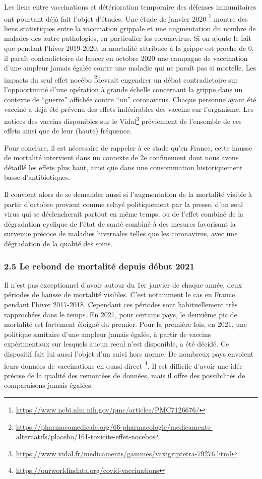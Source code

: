 \documentclass[
]{article}
\begin{document}
Les liens entre vaccinations et détérioration temporaire des défenses
immunitaires ont pourtant déjà fait l'objet d'études. Une étude de
janvier 2020 \footnote{\url{https://www.ncbi.nlm.nih.gov/pmc/articles/PMC7126676/}}
montre des liens statistiques entre la vaccination grippale et une
augmentation du nombre de malades des autre pathologies, en particulier
les coronavirus. Si on ajoute le fait que pendant l'hiver 2019-2020, la
mortalité attribuée à la grippe est proche de 0, il paraît
contradictoire de lancer en octobre 2020 une campagne de vaccination
d'une ampleur jamais égalée contre une maladie qui ne paraît pas si
mortelle. Les impacts du seul effet nocébo \footnote{\url{https://pharmacomedicale.org/66-pharmacologie/medicaments-alternatifs/placebo/161-toxicite-effet-nocebo}}devrait
engendrer un débat contradictoire sur l'oppoortunité d'une opération à
grande échelle concernant la grippe dans un contexte de ``guerre''
affichée contre ``un'' coronavirus. Chaque personne ayant été vacciné a
déjà été prévenu des effets indésirables des vaccins sur l'organisme.
Les notices des vaccins disponibles sur le Vidal\footnote{\url{https://www.vidal.fr/medicaments/gammes/vaxigriptetra-79276.html}}
préviennent de l'ensemble de ces effets ainsi que de leur (haute)
fréquence.

Pour conclure, il est nécessaire de rappeler à ce stade qu'en France,
cette hausse de mortalité intervient dans un contexte de 2e confinement
dont nous avons détaillé les effets plus haut, ainsi que dans une
consommation historiquement basse d'antibiotiques.

Il convient alors de se demander aussi si l'augmentation de la mortalité
visible à partir d'octobre provient comme relayé politiquement par la
presse, d'un seul virus qui se déclencherait partout en même temps, ou
de l'effet combiné de la dégradation cyclique de l'état de santé combiné
à des mesures favorisant la survenue précoce de maladies hivernales
telles que les coronavirus, avec une dégradation de la qualité des
soins.

\hypertarget{le-rebond-de-mortalituxe9-depuis-duxe9but-2021}{%
\subsubsection{2.5 Le rebond de mortalité depuis début
2021}\label{le-rebond-de-mortalituxe9-depuis-duxe9but-2021}}

Il n'est pas exceptionnel d'avoir autour du 1er janvier de chaque année,
deux périodes de hausse de mortalité visibles. C'est notamment le cas en
France pendant l'hiver 2017-2018. Cependant ces périodes sont
habituellement très rapprochées dans le temps. En 2021, pour certains
pays, le deuxième pic de mortalité est fortement éloigné du premier.
Pour la première fois, en 2021, une politique sanitaire d'une ampleur
jamais égalée, à partir de vaccins expérimentaux sur lesquels aucun
recul n'est disponible, a été décidé. Ce dispositif fait lui aussi
l'objet d'un suivi hors norme. De nombreux pays envoient leurs données
de vaccinations en quasi direct \footnote{\url{https://ourworldindata.org/covid-vaccinations}}.
Il est difficile d'avoir une idée précise de la qualité des remontées de
données, mais il offre des possibilités de comparaisons jamais égalées.
\end{document}
